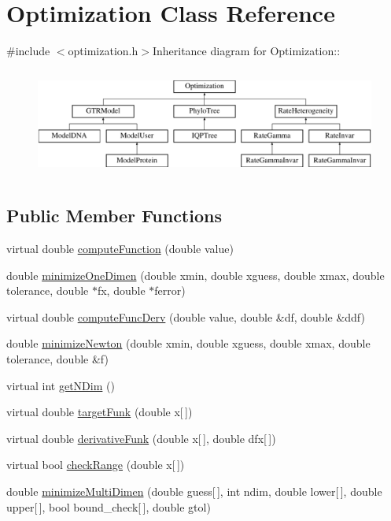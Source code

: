 \hypertarget{classOptimization}{
\section{Optimization Class Reference}
\label{classOptimization}
}


{\ttfamily \#include $<$optimization.h$>$}Inheritance diagram for Optimization::\begin{figure}[H]
\begin{center}
\leavevmode
\includegraphics[height=3.6129cm]{classOptimization}
\end{center}
\end{figure}
\subsection*{Public Member Functions}
\begin{DoxyCompactItemize}
\item 
virtual double \hyperlink{classOptimization_ad7ca7b884076f8c76312d516e23c6609}{computeFunction} (double value)
\item 
double \hyperlink{classOptimization_a59ccdfae81744716ce48226da029d470}{minimizeOneDimen} (double xmin, double xguess, double xmax, double tolerance, double $\ast$fx, double $\ast$ferror)
\item 
virtual double \hyperlink{classOptimization_a18bedacde6fd259ff5923c9e936464bd}{computeFuncDerv} (double value, double \&df, double \&ddf)
\item 
double \hyperlink{classOptimization_a32d3810b12230f4201e03ea25f0320ec}{minimizeNewton} (double xmin, double xguess, double xmax, double tolerance, double \&f)
\item 
virtual int \hyperlink{classOptimization_a6d04cefb0969f3cac9b607aa1412eb57}{getNDim} ()
\item 
virtual double \hyperlink{classOptimization_a7fe7c6178977ef7840ff65d216bf590e}{targetFunk} (double x\mbox{[}$\,$\mbox{]})
\item 
virtual double \hyperlink{classOptimization_a804d1f309afd4285d62bc48b6c00338a}{derivativeFunk} (double x\mbox{[}$\,$\mbox{]}, double dfx\mbox{[}$\,$\mbox{]})
\item 
virtual bool \hyperlink{classOptimization_aa80661f2519aa3a9f1521309e854acfc}{checkRange} (double x\mbox{[}$\,$\mbox{]})
\item 
double \hyperlink{classOptimization_a2e263d2334c328f6a0a8429bc901a42b}{minimizeMultiDimen} (double guess\mbox{[}$\,$\mbox{]}, int ndim, double lower\mbox{[}$\,$\mbox{]}, double upper\mbox{[}$\,$\mbox{]}, bool bound\_\-check\mbox{[}$\,$\mbox{]}, double gtol)
\end{DoxyCompactItemize}


